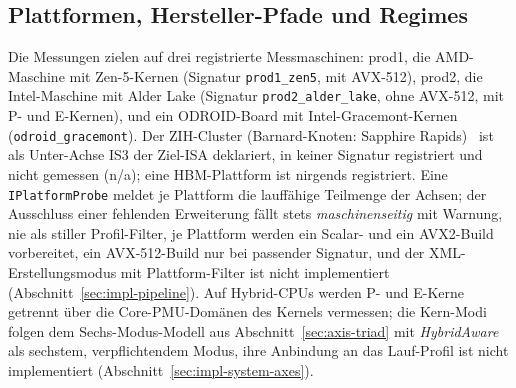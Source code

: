 \begin{nurkurz}
\subsection{Plattformen, Hersteller-Pfade und Regimes}\label{sec:eval-platforms}
Die Messungen zielen auf drei registrierte Messmaschinen: prod1, die AMD-Maschine mit Zen-5-Kernen
(Signatur \texttt{prod1\_zen5}, mit AVX-512), prod2, die Intel-Maschine mit Alder Lake (Signatur
\texttt{prod2\_alder\_lake}, ohne AVX-512, mit P- und E-Kernen), und ein ODROID-Board mit
Intel-Gracemont-Kernen (\texttt{odroid\_gracemont}). Der ZIH-Cluster (Barnard-Knoten: Sapphire Rapids)~\cite{zih_hpc_compendium_hardware}
ist als Unter-Achse IS3 der Ziel-ISA deklariert, in keiner Signatur registriert und nicht gemessen (n/a);
eine HBM-Plattform ist nirgends registriert. Eine \texttt{IPlatformProbe} meldet je Plattform die
lauffähige Teilmenge der Achsen; der Ausschluss einer fehlenden Erweiterung fällt stets
\emph{maschinenseitig} mit Warnung, nie als stiller Profil-Filter, je Plattform werden ein Scalar- und
ein AVX2-Build vorbereitet, ein AVX-512-Build nur bei passender Signatur, und der XML-Erstellungsmodus
mit Plattform-Filter ist nicht implementiert (Abschnitt~\ref{sec:impl-pipeline}). Auf Hybrid-CPUs werden
P- und E-Kerne getrennt über die Core-PMU-Domänen des Kernels vermessen; die Kern-Modi folgen dem
Sechs-Modus-Modell aus Abschnitt~\ref{sec:axis-triad} mit \emph{HybridAware} als sechstem,
verpflichtendem Modus, ihre Anbindung an das Lauf-Profil ist nicht implementiert
(Abschnitt~\ref{sec:impl-system-axes}).
\end{nurkurz}

